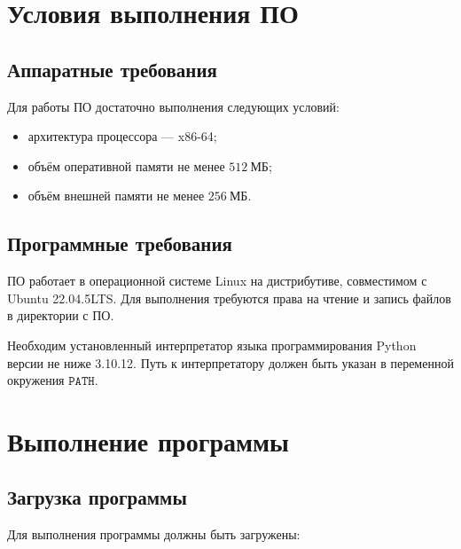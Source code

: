 \documentclass[a4paper, 14pt]{extreport}
\begin{document}
	\chapter{Условия выполнения ПО}
	\label{chapter_conditions}
	
	\section{Аппаратные требования}
	
	Для работы ПО достаточно выполнения следующих условий:
	
	\begin{itemize}
		\item архитектура процессора --- x86-64;
		\item объём оперативной памяти не менее $512\ \text{МБ}$;
		\item объём внешней памяти не менее $256\ \text{МБ}$.
	\end{itemize}

	\section{Программные требования}
	
	ПО работает в операционной системе Linux на дистрибутиве, совместимом с Ubuntu 22.04.5LTS. Для выполнения требуются права на чтение и запись файлов в директории с ПО.
	
	Необходим установленный интерпретатор языка программирования Python версии не ниже 3.10.12. Путь к интерпретатору должен быть указан в переменной окружения $\mathtt{PATH}$.
	
	\chapter{Выполнение программы}
	\label{chapter_process}
	
	\section{Загрузка программы}
	
	Для выполнения программы должны быть загружены:
	
\end{document}

